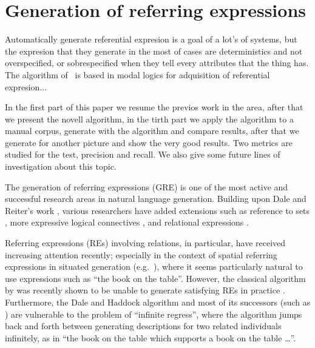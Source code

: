 \section{Generation of referring expressions}\label{sec:gre}


Automatically generate referential expresion is a goal of a lot's of systems, but the expresion that they generate in the most of cases are deterministics and not overspecified, or sobrespecified when they tell every attributes that the thing has.
The algorithm of~\cite{areces08} is based in modal logics for adquisition of referential expresion...

In the first part of this paper we resume the previos work in the area, after that we present the novell algorithm, in the tirth part we apply the algorithm to a manual corpus, generate with the algorithm and compare results, after that we generate for another picture and show the very good results. Two metrics are studied for the test, precision and recall. We also give some future lines of investigation about this topic.  


\cite{paig:thre87}

The generation of referring expressions (GRE) is one of the most
active and successful research areas in natural language generation.
Building upon Dale and Reiter's work \cite{dale89cooking,Dale1995},
various researchers have added extensions such as reference to sets
\cite{Stone2000}, more expressive logical connectives
\cite{deemter02:_gener_refer_expres}, and relational expressions
\cite{dale91:_gener_refer_expres_invol_relat}.

Referring expressions (REs) involving relations, in particular, have
received increasing attention recently; especially in the context of
spatial referring expressions in situated generation (e.g.\
\cite{kelleher06:_increm_gener_of_spatial_refer}), where it seems
particularly natural to use expressions such as ``the book on the
table''.  However, the classical algorithm by
\cite{dale91:_gener_refer_expres_invol_relat} was recently shown to
be unable to generate satisfying REs in practice
\cite{viethen06:_algor_for_gener_refer_expres}.  Furthermore, the Dale
and Haddock algorithm and most of its successors (such as
\cite{kelleher06:_increm_gener_of_spatial_refer}) are vulnerable to
the problem of ``infinite regress'', where the algorithm jumps back
and forth between generating descriptions for two related individuals
infinitely, as in ``the book on the table which supports a book on the
table \ldots''.


